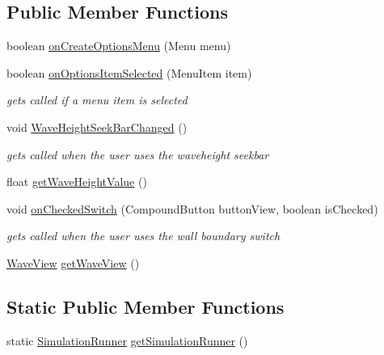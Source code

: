 \subsection*{Public Member Functions}
\begin{DoxyCompactItemize}
\item 
boolean \hyperlink{classInterface_1_1MainActivity_a8eb8f942b2cabf95cf1099709d7a0789}{on\+Create\+Options\+Menu} (Menu menu)
\item 
boolean \hyperlink{classInterface_1_1MainActivity_a0d4de91712d141afd469bd5f8fee964f}{on\+Options\+Item\+Selected} (Menu\+Item item)
\begin{DoxyCompactList}\small\item\em gets called if a menu item is selected \end{DoxyCompactList}\item 
void \hyperlink{classInterface_1_1MainActivity_ab889fa3e126b3e013e93be3e4d973178}{Wave\+Height\+Seek\+Bar\+Changed} ()
\begin{DoxyCompactList}\small\item\em gets called when the user uses the waveheight seekbar \end{DoxyCompactList}\item 
float \hyperlink{classInterface_1_1MainActivity_ab06ac12c0f0ab10dda64940f5d1fe03b}{get\+Wave\+Height\+Value} ()
\item 
void \hyperlink{classInterface_1_1MainActivity_a4d81b62ddcc9d2a6e7239a9273d6baf3}{on\+Checked\+Switch} (Compound\+Button button\+View, boolean is\+Checked)
\begin{DoxyCompactList}\small\item\em gets called when the user uses the wall boundary switch \end{DoxyCompactList}\item 
\hyperlink{classInterface_1_1WaveView}{Wave\+View} \hyperlink{classInterface_1_1MainActivity_ac0cf85cfda9c84fee2508c9cf77026cc}{get\+Wave\+View} ()
\end{DoxyCompactItemize}
\subsection*{Static Public Member Functions}
\begin{DoxyCompactItemize}
\item 
static \hyperlink{classSolver_1_1SimulationRunner}{Simulation\+Runner} \hyperlink{classInterface_1_1MainActivity_a99ed0382ab6104e40d058f21c2af4765}{get\+Simulation\+Runner} ()
\end{DoxyCompactItemize}
